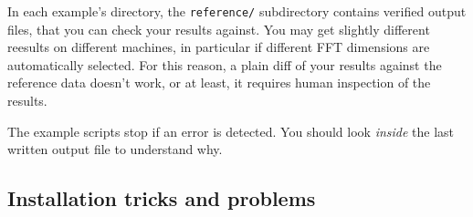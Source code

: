 \documentclass[12pt,a4paper]{article}
\begin{document}
In each example's directory, the \texttt{reference/} subdirectory contains
verified output files, that you can check your results against. You may
get slightly different reesults on different machines, in particular if
different FFT dimensions are automatically selected. For this reason, a
plain diff of your results against the reference data doesn't work, or
at least, it requires human inspection of the results.

The example scripts stop if an error is detected. You should look {\em inside}
the last written output file to understand why.

\subsection{Installation tricks and problems}
\end{document}
